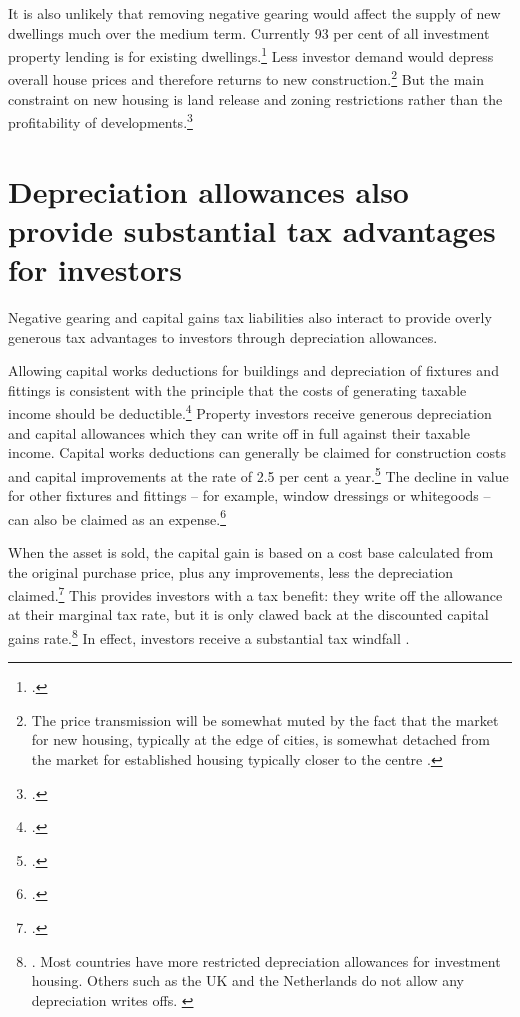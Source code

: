 \documentclass{grattan}\usepackage[]{graphicx}\usepackage[]{color}
\begin{document}
It is also unlikely that removing negative gearing would affect the supply of new dwellings much over the medium term. Currently 93 per cent of all investment property lending is for existing dwellings.\footcite{ABS2015} Less investor demand would depress overall house prices and therefore returns to new construction.\footnote{The price transmission will be somewhat muted by the fact that the market for new housing, typically at the edge of cities, is somewhat detached from the market for established housing typically closer to the centre \textcite[See]{Kelly2011}.} But the main constraint on new housing is land release and zoning restrictions rather than the profitability of developments.\footcite[pp.84-90]{Kelly2013}

\section{Depreciation allowances also provide substantial tax advantages for investors}
Negative gearing and capital gains tax liabilities also interact to provide overly generous tax advantages to investors through depreciation allowances. 

Allowing capital works deductions for buildings and depreciation of fixtures and fittings is consistent with the principle that the costs of generating taxable income should be deductible.\footcite{Commission2004}  Property investors receive generous depreciation and capital allowances which they can write off in full against their taxable income. Capital works deductions can generally be claimed for construction costs and capital improvements at the rate of 2.5 per cent a year.\footcite{ATO2014b} The decline in value for other fixtures and fittings -- for example, window dressings or whitegoods -- can also be claimed as an expense.\footcite{ATO2014c}

When the asset is sold, the capital gain is based on a cost base calculated from the original purchase price, plus any improvements, less the depreciation claimed.\footcite[p.~21]{ATO2014d} This provides investors with a tax benefit: they write off the allowance at their marginal tax rate, but it is only clawed back at the discounted capital gains rate.\footnote{\textcite{RBA2014}. Most countries have more restricted depreciation allowances for investment housing. Others such as the UK and the Netherlands do not allow any depreciation writes offs. \textcite{Commission2004}}  In effect, investors receive a substantial tax windfall .  
\end{document}
